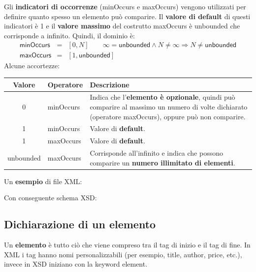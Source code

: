 \documentclass[a4paper]{article}
\begin{document}
	Gli \textcolor{Red3}{\textbf{indicatori di occorrenze}} (\textsf{minOccurs} e \textsf{maxOccurs}) vengono utilizzati per definire quanto spesso un elemento può comparire. Il \textbf{valore di default} di questi indicatori è 1 e il \textbf{valore massimo} del costrutto \textsf{maxOccurs} è \textsf{unbounded} che corrisponde a infinito. Quindi, il dominio è:
	\begin{equation*}
		\begin{array}{lll}
			\textsf{minOccurs} &=& \left[0, N\right] \hspace{2em} \infty = \textsf{unbounded} \land N \neq \infty \Longrightarrow N \neq \textsf{unbounded} \\
			\textsf{maxOccurs} &=& \left[1,\textsf{unbounded}\right]
		\end{array}
	\end{equation*}
	Alcune accortezze:
	\begin{table}[!htp]
		\centering
		\begin{tabular}{@{} c l p{18em} @{}}
			\toprule
			Valore 	& Operatore & Descrizione \\
			\midrule
			0		& \textsf{minOccurs}	& Indica che l'\textbf{elemento è opzionale}, quindi può comparire al massimo un numero di volte dichiarato (operatore \textsf{maxOccurs}), oppure può non comparire. \\ [0.5em]
			1		& \textsf{minOccurs}	& Valore di \textbf{default}. \\ [0.5em]
			1		& \textsf{maxOccurs}	& Valore di \textbf{default}. \\ [0.5em]
			\textsf{unbounded} & \textsf{maxOccurs} & Corrisponde all'infinito e indica che possono comparire un \textbf{numero illimitato di elementi}. \\
			\bottomrule
		\end{tabular}
	\end{table}\newpage
	
	\noindent
	Un \textcolor{Green4}{\textbf{esempio}} di file XML:
	
	Con conseguente schema XSD:
	\newpage
	
	\subsection{Dichiarazione di un elemento}
	
	Un \textcolor{Red3}{\textbf{elemento}} è tutto ciò che viene compreso tra il tag di inizio e il tag di fine. In XML i tag hanno nomi personalizzabili (per esempio, title, author, price, etc.), invece in XSD iniziano con la keyword \textsf{element}.\newline
	
\end{document}
